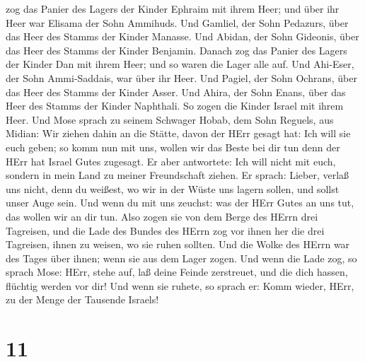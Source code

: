 zog das Panier des Lagers der Kinder Ephraim mit ihrem Heer; und über
ihr Heer war Elisama der Sohn Ammihuds.  Und Gamliel, der
Sohn Pedazurs, über das Heer des Stamms der Kinder Manasse.
 Und Abidan, der Sohn Gideonis, über das Heer des Stamms
der Kinder Benjamin.  Danach zog das Panier des Lagers der
Kinder Dan mit ihrem Heer; und so waren die Lager alle auf. Und
Ahi-Eser, der Sohn Ammi-Saddais, war über ihr Heer.  Und
Pagiel, der Sohn Ochrans, über das Heer des Stamms der Kinder Asser.
 Und Ahira, der Sohn Enans, über das Heer des Stamms der
Kinder Naphthali.  So zogen die Kinder Israel mit ihrem
Heer.  Und Mose sprach zu seinem Schwager Hobab, dem Sohn
Reguels, aus Midian: Wir ziehen dahin an die Stätte, davon der HErr
gesagt hat: Ich will sie euch geben; so komm nun mit uns, wollen wir das
Beste bei dir tun denn der HErr hat Israel Gutes zugesagt. 
Er aber antwortete: Ich will nicht mit euch, sondern in mein Land zu
meiner Freundschaft ziehen.  Er sprach: Lieber, verlaß uns
nicht, denn du weißest, wo wir in der Wüste uns lagern sollen, und
sollst unser Auge sein.  Und wenn du mit uns zeuchst: was
der HErr Gutes an uns tut, das wollen wir an dir tun.  Also
zogen sie von dem Berge des HErrn drei Tagreisen, und die Lade des
Bundes des HErrn zog vor ihnen her die drei Tagreisen, ihnen zu weisen,
wo sie ruhen sollten.  Und die Wolke des HErrn war des
Tages über ihnen; wenn sie aus dem Lager zogen.  Und wenn
die Lade zog, so sprach Mose: HErr, stehe auf, laß deine Feinde
zerstreuet, und die dich hassen, flüchtig werden vor dir! 
Und wenn sie ruhete, so sprach er: Komm wieder, HErr, zu der Menge der
Tausende Israels!

\hypertarget{section-10}{%
\section{11}\label{section-10}}

